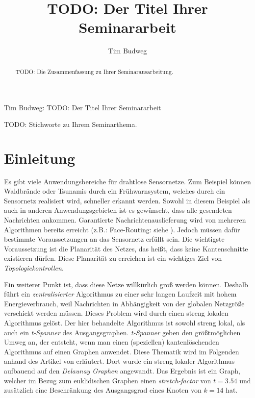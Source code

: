 \documentclass[a4paper,twoside]{IEEEtran}
\newcommand{\seminarteilnehmer}{Tim Budweg}
\newcommand{\seminartitel}{TODO: Der Titel Ihrer Seminararbeit}
\begin{document}
\title{\seminartitel}
\author{\seminarteilnehmer}

%
{\seminarteilnehmer: \seminartitel}


\maketitle

\begin{abstract}
TODO: Die Zusammenfassung zu Ihrer Seminarausarbeitung.
\end{abstract}

\begin{IEEEkeywords}
TODO: Stichworte zu Ihrem Seminarthema.
\end{IEEEkeywords}


\section{Einleitung}
Es gibt viele Anwendungsbereiche für drahtlose Sensornetze. 
Zum Beispiel können Waldbrände oder Tsunamis durch ein Frühwarnsystem, welches durch ein Sensornetz realisiert wird, schneller erkannt werden. 
Sowohl in diesem Beispiel als auch in anderen Anwendungsgebieten ist es gewünscht, dass alle gesendeten Nachrichten ankommen.
Garantierte Nachrichtenauslieferung wird von mehreren Algorithmen bereits erreicht (z.B.: Face-Routing: siehe \cite{FaceRouting}).
Jedoch müssen dafür bestimmte Voraussetzungen an das Sensornetz erfüllt sein. 
Die wichtigste Voraussetzung ist die Planarität des Netzes, das heißt, dass keine Kantenschnitte existieren dürfen. 
Diese Planarität zu erreichen ist ein wichtiges Ziel von \textit{Topologiekontrollen}.

Ein weiterer Punkt ist, dass diese Netze willkürlich groß werden können.
Deshalb führt ein \textit{zentralisierter} Algorithmus zu einer sehr langen Laufzeit mit hohem Energieverbrauch, weil Nachrichten in Abhängigkeit von der globalen Netzgröße verschickt werden müssen. 
Dieses Problem wird durch einen streng lokalen Algorithmus gelöst.
Der hier behandelte Algorithmus ist sowohl streng lokal, als auch ein \textit{t-Spanner} des Ausgangsgraphen.
\textit{t-Spanner} geben den größtmöglichen Umweg an, der entsteht, wenn man einen (speziellen) kantenlöschenden Algorithmus auf einen Graphen anwendet.
Diese Thematik wird im Folgenden anhand des Artikel von \cite{kanj} erläutert.
Dort wurde ein streng lokaler Algorithmus aufbauend auf den \textit{Delaunay Graphen} angewandt.
Das Ergebnis ist ein Graph, welcher im Bezug zum euklidischen Graphen einen \textit{stretch-factor} von $t=3.54 $ und zusätzlich eine Beschränkung des Ausgangsgrad eines Knoten von $k=14 $ hat.
\end{document}
